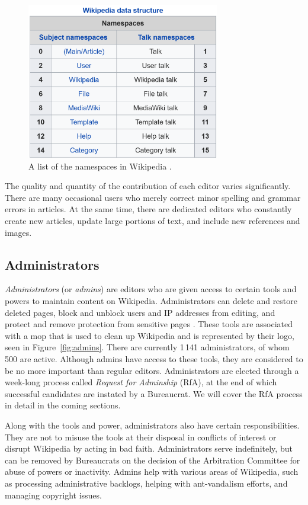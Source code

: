 \begin{figure}[htp]
    \centering
    \includegraphics[width=0.75\textwidth]{images/namespaces.PNG}
    \caption{A list of the namespaces in Wikipedia \cite{wiki:namespace}.}
    \label{fig:namespace}
\end{figure}

The quality and quantity of the contribution of each editor varies significantly.
There are many occasional users who merely correct minor spelling and grammar errors in articles.
At the same time, there are dedicated editors who constantly create new articles, update large portions of text, and include new references and images.   

\subsection{Administrators}
\textit{Administrators} (or \textit{admins}) are editors who are given access to certain tools and powers to maintain content on Wikipedia.
Administrators can delete and restore deleted pages, block and unblock users and IP addresses from editing, and protect and remove protection from sensitive pages \cite{wiki:admins}.
These tools are associated with a mop that is used to clean up Wikipedia and is represented by their logo, seen in Figure~\ref{fig:admins}. 
There are currently 1\,141 administrators, of whom 500 are active.
Although admins have access to these tools, they are considered to be no more important than regular editors.
Administrators are elected through a week-long process called \textit{Request for Adminship} (RfA), at the end of which successful candidates are instated by a Bureaucrat.
We will cover the RfA process in detail in the coming sections. 

Along with the tools and power, administrators also have certain responsibilities.
They are not to misuse the tools at their disposal in conflicts of interest or disrupt Wikipedia by acting in bad faith.
Administrators serve indefinitely, but can be removed  by Bureaucrats on the decision of the Arbitration Committee for abuse of powers or inactivity.
Admins help with various areas of Wikipedia, such as processing administrative backlogs, helping with ant-vandalism efforts, and managing copyright issues. 

